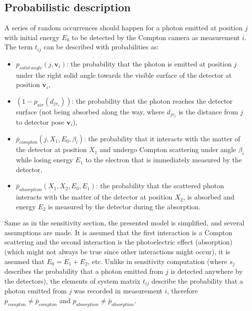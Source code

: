\subsection{Probabilistic description}
A series of random occurrences should happen for a photon emitted at position $j$ with initial energy $E_{0}$ to be detected by the Compton camera as measurement $i$.
The term $t_{ij}$ can be described with probabilities as:
\begin{itemize}
  \item $p_{solid\ angle}(j, \mathbf{v}_{i}) $: the probability that the photon is emitted at position $j$ under the right solid angle towards the visible surface of the detector at position $\mathbf{v}_{i}$,
  \item $(1-p_{air}(d_{jv_{i}}))$: the probability that the photon reaches the detector surface (not being absorbed along the way, where $d_{jv_{i}}$ is the distance from $j$ to detector pose $\mathbf{v}_{i}$),
  \item $\bar{p}_{compton}(j, X_{1}, E_{0}, \beta_{i})$: the probability that it interacts with the matter of the detector at position $X_{1}$ and undergo Compton scattering under angle $\beta_{i}$ while losing energy $E_{1}$ to the electron that is immediately measured by the detector,
  \item $\bar{p}_{absorption}(X_{1}, X_{2}, E_{0}, E_{1})$: the probability that the scattered photon interacts with the matter of the detector at position $X_{2}$, is absorbed and energy $E_{2}$ is measured by the detector during the absorption.
\end{itemize}
Same as in the sensitivity section, the presented model is simplified, and several assumptions are made. 
It is assumed that the first interaction is a Compton scattering and the second interaction is the photoelectric effect (absorption) (which might not always be true since other interactions might occur), it is assumed that $E_{0} = E_{1} + E_{2}$, etc.
Unlike in sensitivity computation (where $s_{j}$ describes the probability that a photon emitted from $j$ is detected anywhere by the detectors), the elements of system matrix $t_{ij}$ describe the probability that a photon emitted from $j$ was recorded in measurement $i$, therefore $p_{compton}\neq \bar{p}_{compton}$ and  $p_{absorption}\neq \bar{p}_{absorption}$.


